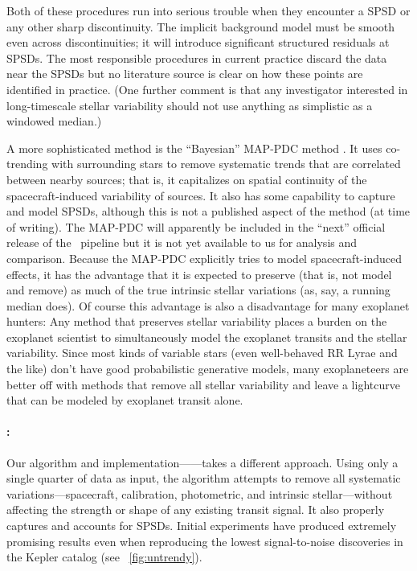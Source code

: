 \documentclass[letterpaper,12pt,preprint]{hack_aastex}
\newcommand{\Untrendy}{\package{Untrendy}}
\begin{document}
Both of these procedures run into serious trouble when they encounter a SPSD
or any other sharp discontinuity.
The implicit background model must be smooth even across discontinuities; it
will introduce significant structured residuals at SPSDs.
The most responsible procedures in current practice discard the data
near the SPSDs but no literature source is clear on how these points are
identified in practice.
(One further comment is that any investigator interested in long-timescale stellar variability
should not use anything as simplistic as a windowed median.)

A more sophisticated method is the ``Bayesian'' MAP-PDC method
\citep{map-pdc1,map-pdc2}.
It uses co-trending with surrounding stars to remove systematic trends that
are correlated between nearby sources; that is, it capitalizes on spatial
continuity of the spacecraft-induced variability of sources.
It also has some capability to capture and model SPSDs, although this is not
a published aspect of the method (at time of writing).
The MAP-PDC will apparently be included in the ``next'' official release of the
\Kepler\ pipeline but it is not yet available to us for analysis and comparison.
Because the MAP-PDC explicitly tries to model spacecraft-induced effects, it
has the advantage that it is expected to preserve (that is, not model and
remove) as much of the true intrinsic stellar variations (as, say, a running
median does).
Of course this advantage is also a disadvantage for many exoplanet hunters:
Any method that preserves stellar variability places a burden on the exoplanet
scientist to simultaneously model the exoplanet transits and the stellar
variability.
Since most kinds of variable stars (even well-behaved RR Lyrae and the like)
don't have good probabilistic generative models, many exoplaneteers are better
off with methods that remove all stellar variability and leave a lightcurve
that can be modeled by exoplanet transit alone.


\paragraph{\Untrendy:}
Our algorithm and implementation---\Untrendy---takes a
different approach.
Using only a single quarter of data as input, the algorithm attempts to
remove all systematic variations---spacecraft, calibration, photometric, and
intrinsic stellar---without affecting the strength or shape of any existing
transit signal.
It also properly captures and accounts for SPSDs.
Initial experiments have produced extremely promising results even when
reproducing the lowest signal-to-noise discoveries in the Kepler catalog
(see \figurename~\ref{fig:untrendy}).
\end{document}
